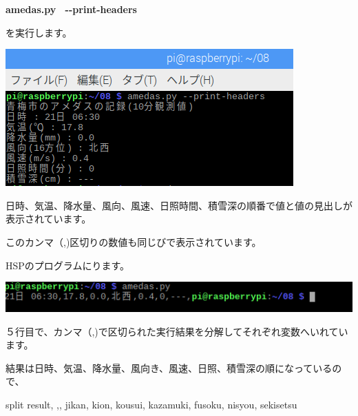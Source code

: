 \textbf{amedas.py \ {}-{}-print-headers}

を実行します。



\begin{center}
\includegraphics[width=\textwidth]{./text08-img/textbook-img032-2.png}

\end{center}
日時、気温、降水量、風向、風速、日照時間、積雪深の順番で値と値の見出しが表示されています。

このカンマ（,)区切りの数値も同じびで表示されています。

HSPのプログラムにります。

\begin{center}
\includegraphics[width=\textwidth]{./text08-img/textbook-img032-1.png}

\end{center}
５行目で、カンマ（,)で区切られた実行結果を分解してそれぞれ変数へいれています。

結果は日時、気温、降水量、風向き、風速、日照、積雪深の順になっているので、

split result, {\textquotedbl},{\textquotedbl}, jikan, kion, kousui, kazamuki, fusoku, nisyou, sekisetsu


\bigskip



